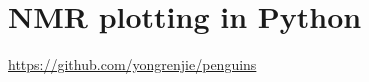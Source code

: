 \section{NMR plotting in Python}
\label{sec:appendix/penguins}

\url{https://github.com/yongrenjie/penguins}
